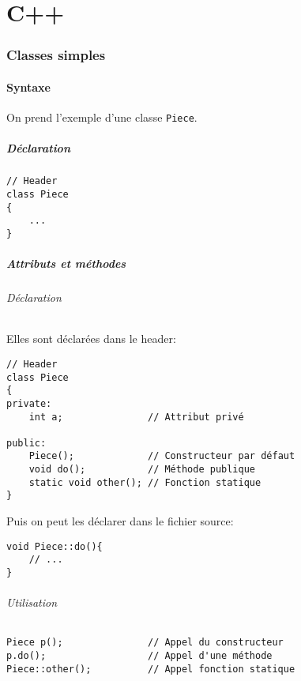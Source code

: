 \documentclass[10pt,a4paper,french]{article}
\begin{document}
\part{C++}

\section{Classes simples}

\subsection{Syntaxe}

On prend l'exemple d'une classe {\tt Piece}.

\subsubsection{Déclaration}

\begin{verbatim}
// Header
class Piece
{
    ...
}
\end{verbatim}

\subsubsection{Attributs et méthodes}

\paragraph{Déclaration}
Elles sont déclarées dans le header:
\begin{verbatim}
// Header
class Piece
{
private:
    int a;               // Attribut privé

public:
    Piece();             // Constructeur par défaut
    void do();           // Méthode publique
    static void other(); // Fonction statique
}
\end{verbatim}

Puis on peut les déclarer dans le fichier source:
\begin{verbatim}
void Piece::do(){
    // ...
}
\end{verbatim}

\paragraph{Utilisation}
\begin{verbatim}
Piece p();               // Appel du constructeur
p.do();                  // Appel d'une méthode
Piece::other();          // Appel fonction statique
\end{verbatim}
\end{document}
